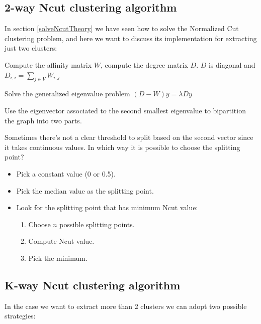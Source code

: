 \subsection{2-way Ncut clustering algorithm}
In section \ref{solveNcutTheory} we have seen how to solve the Normalized Cut clustering problem, and here we want to discuss its implementation for extracting just two clusters:
\begin{enumerate}
\end{enumerate}
Sometimes there's not a clear threshold to split based on the second vector since it takes continuous values. In which way it is possible to choose the splitting point?
\begin{itemize}

	\item Pick a constant value (0 or 0.5).
	\item Pick the median value as the splitting point.
	\item Look for the splitting point that has minimum Ncut value:
	\begin{enumerate}
		\item Choose $n$ possible splitting points.
		\item Compute Ncut value.
		\item Pick the minimum.
	\end{enumerate}

\end{itemize}

\subsection{K-way Ncut clustering algorithm}
In the case we want to extract more than 2 clusters we can adopt two possible strategies:
